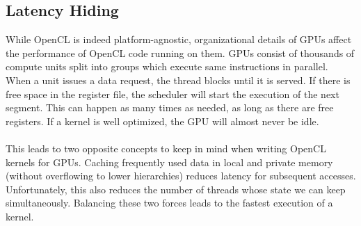 \subsection{Latency Hiding}

While OpenCL is indeed platform-agnostic, organizational details of GPUs affect the performance of OpenCL code running on them. GPUs consist of thousands of compute units split into groups which execute same instructions in parallel. When a unit issues a data request, the thread blocks until it is served. If there is free space in the register file, the scheduler will start the execution of the next segment. This can happen as many times as needed, as long as there are free registers. If a kernel is well optimized, the GPU will almost never be idle.\\
\\
This leads to two opposite concepts to keep in mind when writing OpenCL kernels for GPUs. Caching frequently used data in local and private memory (without overflowing to lower hierarchies) reduces latency for subsequent accesses. Unfortunately, this also reduces the number of threads whose state we can keep simultaneously. Balancing these two forces leads to the fastest execution of a kernel.\\
